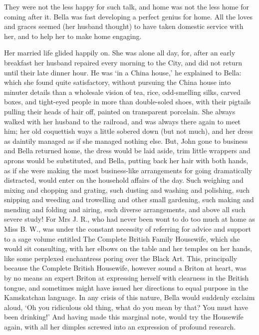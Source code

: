They were not the less happy for such talk, and home was not the less
home for coming after it. Bella was fast developing a perfect genius
for home. All the loves and graces seemed (her husband thought) to have
taken domestic service with her, and to help her to make home engaging.

Her married life glided happily on. She was alone all day, for, after an
early breakfast her husband repaired every morning to the City, and did
not return until their late dinner hour. He was ‘in a China house,’ he
explained to Bella: which she found quite satisfactory, without pursuing
the China house into minuter details than a wholesale vision of tea,
rice, odd-smelling silks, carved boxes, and tight-eyed people in more
than double-soled shoes, with their pigtails pulling their heads of
hair off, painted on transparent porcelain. She always walked with her
husband to the railroad, and was always there again to meet him; her old
coquettish ways a little sobered down (but not much), and her dress
as daintily managed as if she managed nothing else. But, John gone to
business and Bella returned home, the dress would be laid aside, trim
little wrappers and aprons would be substituted, and Bella, putting back
her hair with both hands, as if she were making the most business-like
arrangements for going dramatically distracted, would enter on the
household affairs of the day. Such weighing and mixing and chopping
and grating, such dusting and washing and polishing, such snipping
and weeding and trowelling and other small gardening, such making and
mending and folding and airing, such diverse arrangements, and above all
such severe study! For Mrs J. R., who had never been wont to do too much
at home as Miss B. W., was under the constant necessity of referring for
advice and support to a sage volume entitled The Complete British Family
Housewife, which she would sit consulting, with her elbows on the table
and her temples on her hands, like some perplexed enchantress poring
over the Black Art. This, principally because the Complete British
Housewife, however sound a Briton at heart, was by no means an expert
Briton at expressing herself with clearness in the British tongue,
and sometimes might have issued her directions to equal purpose in the
Kamskatchan language. In any crisis of this nature, Bella would suddenly
exclaim aloud, ‘Oh you ridiculous old thing, what do you mean by that?
You must have been drinking!’ And having made this marginal note, would
try the Housewife again, with all her dimples screwed into an expression
of profound research.

